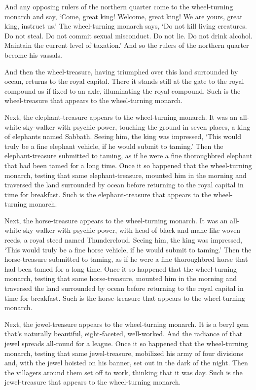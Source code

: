 \documentclass[12pt,openany]{book}%
\begin{document}
And any opposing rulers of the northern quarter come to the wheel-turning monarch and say, ‘Come, great king! Welcome, great king! We are yours, great king, instruct us.’ The wheel-turning monarch says, ‘Do not kill living creatures. Do not steal. Do not commit sexual misconduct. Do not lie. Do not drink alcohol. Maintain the current level of taxation.’ And so the rulers of the northern quarter become his vassals. 

And then the wheel-treasure, having triumphed over this land surrounded by ocean, returns to the royal capital. There it stands still at the gate to the royal compound as if fixed to an axle, illuminating the royal compound. Such is the wheel-treasure that appears to the wheel-turning monarch. 

Next, the elephant-treasure appears to the wheel-turning monarch. It was an all-white sky-walker with psychic power, touching the ground in seven places, a king of elephants named Sabbath. Seeing him, the king was impressed, ‘This would truly be a fine elephant vehicle, if he would submit to taming.’ Then the elephant-treasure submitted to taming, as if he were a fine thoroughbred elephant that had been tamed for a long time. Once it so happened that the wheel-turning monarch, testing that same elephant-treasure, mounted him in the morning and traversed the land surrounded by ocean before returning to the royal capital in time for breakfast. Such is the elephant-treasure that appears to the wheel-turning monarch. 

Next, the horse-treasure appears to the wheel-turning monarch. It was an all-white sky-walker with psychic power, with head of black and mane like woven reeds, a royal steed named Thundercloud. Seeing him, the king was impressed, ‘This would truly be a fine horse vehicle, if he would submit to taming.’ Then the horse-treasure submitted to taming, as if he were a fine thoroughbred horse that had been tamed for a long time. Once it so happened that the wheel-turning monarch, testing that same horse-treasure, mounted him in the morning and traversed the land surrounded by ocean before returning to the royal capital in time for breakfast. Such is the horse-treasure that appears to the wheel-turning monarch. 

Next, the jewel-treasure appears to the wheel-turning monarch. It is a beryl gem that’s naturally beautiful, eight-faceted, well-worked. And the radiance of that jewel spreads all-round for a league. Once it so happened that the wheel-turning monarch, testing that same jewel-treasure, mobilized his army of four divisions and, with the jewel hoisted on his banner, set out in the dark of the night. Then the villagers around them set off to work, thinking that it was day. Such is the jewel-treasure that appears to the wheel-turning monarch. 
\end{document}
